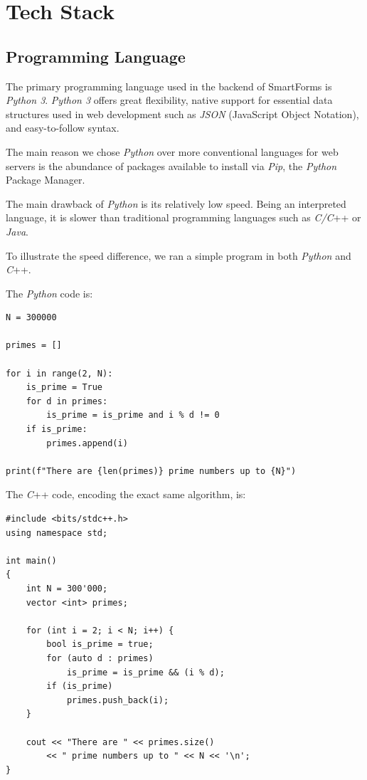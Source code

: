 \documentclass[11pt, a4paper]{report}
\begin{document}
\chapter{Tech Stack}
\label{chapter-tech-stack}

\section{Programming Language}

The primary programming language used in the backend of SmartForms is \textit{Python 3}.
\textit{Python 3} offers great flexibility, native support for essential data structures used in web development such as \textit{JSON} (JavaScript Object Notation), and easy-to-follow syntax.

The main reason we chose \textit{Python} over more conventional languages for web servers is the abundance of packages available to install via \textit{Pip}, the \textit{Python} Package Manager.

The main drawback of \textit{Python} is its relatively low speed. Being an interpreted language, it is slower than traditional programming languages such as \textit{C/C}++ or \textit{Java}.

To illustrate the speed difference, we ran a simple program in both \textit{Python} and \textit{C}++.

The \textit{Python} code is:

\begin{verbatim}
N = 300000

primes = []

for i in range(2, N):
    is_prime = True
    for d in primes:
        is_prime = is_prime and i % d != 0
    if is_prime:
        primes.append(i)

print(f"There are {len(primes)} prime numbers up to {N}")
\end{verbatim}

The \textit{C}++ code, encoding the exact same algorithm, is:
\begin{verbatim}
#include <bits/stdc++.h>
using namespace std;

int main()
{
    int N = 300'000;
    vector <int> primes;

    for (int i = 2; i < N; i++) {
        bool is_prime = true;
        for (auto d : primes)
            is_prime = is_prime && (i % d);
        if (is_prime)
            primes.push_back(i);
    }

    cout << "There are " << primes.size()
        << " prime numbers up to " << N << '\n';
}
\end{verbatim}
\end{document}
